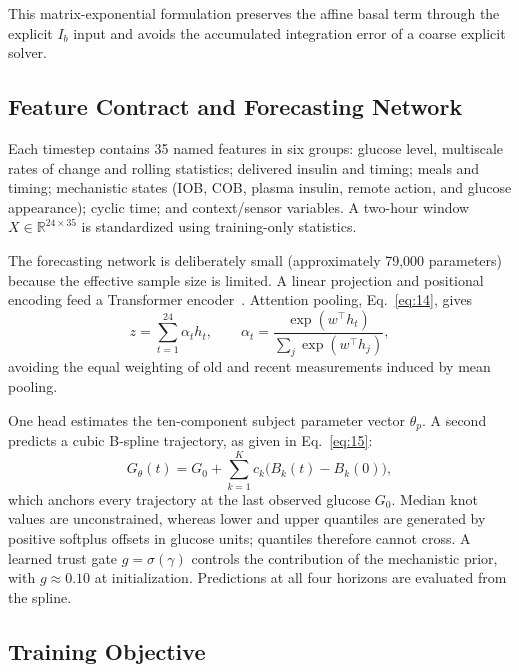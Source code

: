 \documentclass[journal]{IEEEtran}
\begin{document}
This matrix-exponential formulation preserves the affine basal term through the explicit $I_b$ input and avoids the accumulated integration error of a coarse explicit solver.

\subsection{Feature Contract and Forecasting Network}

Each timestep contains 35 named features in six groups: glucose level, multiscale rates of change and rolling statistics; delivered insulin and timing; meals and timing; mechanistic states (IOB, COB, plasma insulin, remote action, and glucose appearance); cyclic time; and context/sensor variables. A two-hour window $X \in \mathbb{R}^{24 \times 35}$ is standardized using training-only statistics.

The forecasting network is deliberately small (approximately 79,000 parameters) because the effective sample size is limited. A linear projection and positional encoding feed a Transformer encoder~\cite{ref38}. Attention pooling, Eq.~\eqref{eq:14}, gives
\begin{equation}
z = \sum_{t=1}^{24} \alpha_t h_t, \qquad \alpha_t = \frac{\exp(w^\top h_t)}{\sum_j \exp(w^\top h_j)},
\label{eq:14}
\end{equation}
avoiding the equal weighting of old and recent measurements induced by mean pooling.

One head estimates the ten-component subject parameter vector $\theta_p$. A second predicts a cubic B-spline trajectory, as given in Eq.~\eqref{eq:15}:
\begin{equation}
G_\theta(t) = G_0 + \sum_{k=1}^{K} c_k \big(B_k(t) - B_k(0)\big),
\label{eq:15}
\end{equation}
which anchors every trajectory at the last observed glucose $G_0$. Median knot values are unconstrained, whereas lower and upper quantiles are generated by positive softplus offsets in glucose units; quantiles therefore cannot cross. A learned trust gate $g = \sigma(\gamma)$ controls the contribution of the mechanistic prior, with $g \approx 0.10$ at initialization. Predictions at all four horizons are evaluated from the spline.

\subsection{Training Objective}
\end{document}
